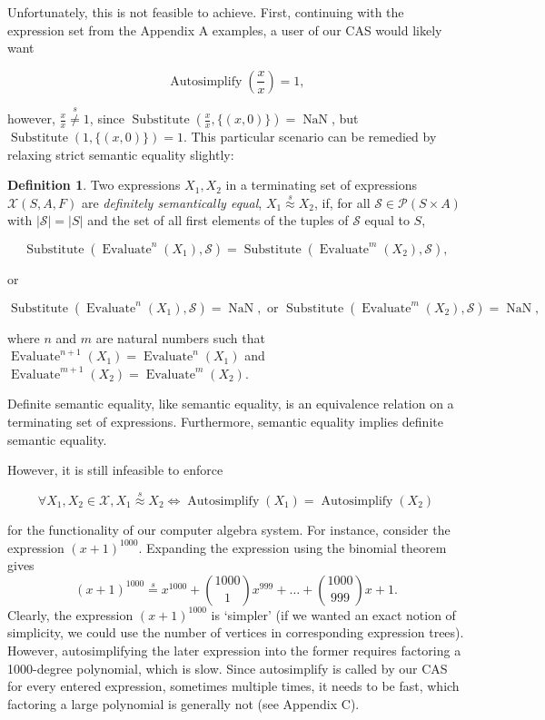 \documentclass{article}
\theoremstyle{definition}
\newtheorem{defin}[thm]{Definition}
\DeclareMathOperator{\Autosimplify}{Autosimplify}
\DeclareMathOperator{\NaN}{NaN}
\DeclareMathOperator{\subs}{Substitute}
\DeclareMathOperator{\eval}{Evaluate}
\begin{document}
Unfortunately, this is not feasible to achieve. First, continuing with the expression set from the Appendix A examples, a user of our CAS would likely want

\begin{equation*}
    \Autosimplify\left(\frac{x}{x}\right) = 1,
\end{equation*}

however, $\frac{x}{x} \overset{s}{\neq} 1$, since $\subs(\frac{x}{x}, \{(x, 0)\}) = \NaN$, but $\subs(1, \{(x, 0)\}) = 1$. This particular scenario can be remedied by relaxing strict semantic equality slightly:

\begin{defin}
    Two expressions $X_1, X_2$ in a terminating set of expressions $\mathcal{X}(S, A, F)$ are \emph{definitely semantically equal}, $X_1\overset{s}{\approx}X_2$, if, for all $\mathcal{S} \in \mathcal{P}(S \times A)$ with $|\mathcal{S}| = |S|$ and the set of all first elements of the tuples of $\mathcal{S}$ equal to $S$,
    
    \begin{equation*}
        \subs(\eval^n(X_1), \mathcal{S}) = \subs(\eval^m(X_2), \mathcal{S}),
    \end{equation*}
    
    or
    
    \begin{equation*}
    \subs(\eval^n(X_1), \mathcal{S}) = \NaN, \text{ or } \subs(\eval^m(X_2), \mathcal{S}) = \NaN,
    \end{equation*}
    
    where $n$ and $m$ are natural numbers such that $\eval^{n+1}(X_1) = \eval^n(X_1)$ and $\eval^{m+1}(X_2) = \eval^m(X_2)$.
\end{defin}

Definite semantic equality, like semantic equality, is an equivalence relation on a terminating set of expressions. Furthermore, semantic equality implies definite semantic equality.

However, it is still infeasible to enforce

\begin{equation*}
    \forall X_1, X_2 \in \mathcal{X}, X_1 \overset{s}{\approx} X_2 \iff \Autosimplify(X_1) = \Autosimplify(X_2)
\end{equation*}

for the functionality of our computer algebra system. For instance, consider the expression $(x+1)^{1000}$. Expanding the expression using the binomial theorem gives \[(x+1)^{1000} \overset{s}{=} x^{1000}+\binom{1000}{1} x^{999}+ \ldots + \binom{1000}{999} x+1.\] Clearly, the expression $(x+1)^{1000}$ is `simpler' (if we wanted an exact notion of simplicity, we could use the number of vertices in corresponding expression trees). However, autosimplifying the later expression into the former requires factoring a 1000-degree polynomial, which is slow. Since autosimplify is called by our CAS for every entered expression, sometimes multiple times, it needs to be fast, which factoring a large polynomial is generally not (see Appendix C).
\end{document}
